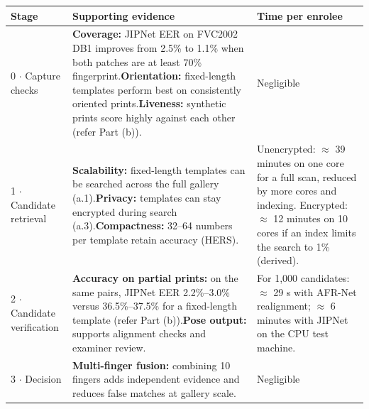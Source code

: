 \documentclass[10pt,a4paper]{article}
\begin{document}
\begin{tabularx}{\textwidth}{@{}>{\raggedright}p{2.6cm}>{\raggedright}X>{\raggedright\arraybackslash}p{5.2cm}@{}}\toprule
\textbf{Stage} & \textbf{Supporting evidence} & \textbf{Time per enrolee}\\\midrule
0 $\cdot$ Capture checks & \textbf{Coverage:} JIPNet EER on FVC2002 DB1 improves from 2.5\% to 1.1\% when both patches are at least 70\% fingerprint.\newline \textbf{Orientation:} fixed-length templates perform best on consistently oriented prints.\newline \textbf{Liveness:} synthetic prints score highly against each other (refer Part (b)). & Negligible\\\midrule
1 $\cdot$ Candidate retrieval & \textbf{Scalability:} fixed-length templates can be searched across the full gallery (a.1).\newline \textbf{Privacy:} templates can stay encrypted during search (a.3).\newline \textbf{Compactness:} 32--64 numbers per template retain accuracy (HERS). & Unencrypted: $\approx$ 39 minutes on one core for a full scan, reduced by more cores and indexing. Encrypted: $\approx$ 12 minutes on 10 cores if an index limits the search to 1\% (derived).\\\midrule
2 $\cdot$ Candidate verification & \textbf{Accuracy on partial prints:} on the same pairs, JIPNet EER 2.2\%--3.0\% versus 36.5\%--37.5\% for a fixed-length template (refer Part (b)).\newline \textbf{Pose output:} supports alignment checks and examiner review. & For 1{,}000 candidates: $\approx$ 29 s with AFR-Net realignment; $\approx$ 6 minutes with JIPNet on the CPU test machine.\\\midrule
3 $\cdot$ Decision & \textbf{Multi-finger fusion:} combining 10 fingers adds independent evidence and reduces false matches at gallery scale. & Negligible\\\bottomrule
\end{tabularx}
\end{document}
